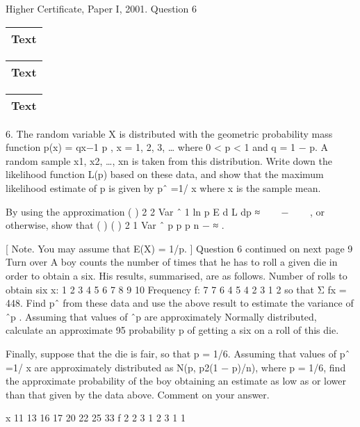 \documentclass[a4paper,12pt]{article}
\begin{document}
Higher Certificate, Paper I, 2001. Question 6
\begin{table}[ht!]
     \centering
     \begin{tabular}{|p{15cm}|}
     \hline        
\noindent Text
\\ \hline
      \end{tabular}
    \end{table}

\begin{table}[ht!]
     \centering
     \begin{tabular}{|p{15cm}|}
     \hline        
\noindent Text
\\ \hline
      \end{tabular}
    \end{table}
    
    \begin{table}[ht!]
     \centering
     \begin{tabular}{|p{15cm}|}
     \hline        
\noindent Text
\\ \hline
      \end{tabular}
    \end{table}

\begin{framed}
6. The random variable X is distributed with the geometric probability mass function
p(x) = qx−1 p , x = 1, 2, 3, …
where 0 < p < 1 and q = 1 − p. A random sample x1, x2, …, xn is taken from this
distribution.
Write down the likelihood function L(p) based on these data, and show that the
maximum likelihood estimate of p is given by
pˆ =1/ x
where x is the sample mean.

By using the approximation
( ) 2
2
Var ˆ 1
ln
p
E d L
dp
≈
 
 − 
 
,
or otherwise, show that
( ) ( ) 2 1
Var ˆ
p p
p
n
−
≈ .

[ Note. You may assume that E(X) = 1/p. ]
Question 6 continued on next page
9
Turn over
A boy counts the number of times that he has to roll a given die in order to obtain
a six. His results, summarised, are as follows.
Number of rolls
to obtain six
x: 1 2 3 4 5 6 7 8 9 10
Frequency f: 7 7 6 4 5 4 2 3 1 2
so that Σ fx = 448. Find pˆ from these data and use the above result to estimate
the variance of ˆp . Assuming that values of ˆp are approximately Normally
distributed, calculate an approximate 95%
probability p of getting a six on a roll of this die.

Finally, suppose that the die is fair, so that p = 1/6. Assuming that values of
pˆ =1/ x are approximately distributed as N(p, p2(1 − p)/n), where p = 1/6, find
the approximate probability of the boy obtaining an estimate as low as or lower
than that given by the data above.
Comment on your answer.

x 11 13 16 17 20 22 25 33
f 2 2 3 1 2 3 1 1

\end{framed}
\end{document}

